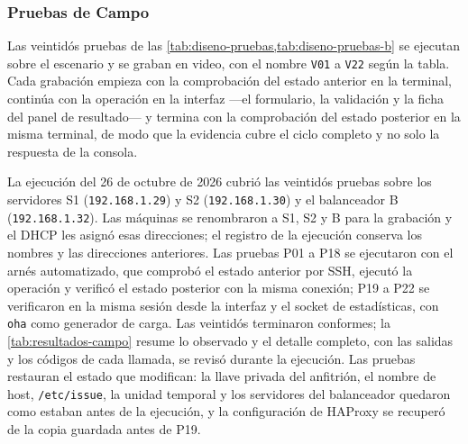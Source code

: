 \subsubsection{Pruebas de Campo}
\label{sec:resultados-campo}

Las veintidós pruebas de las \cref{tab:diseno-pruebas,tab:diseno-pruebas-b} se ejecutan sobre
el escenario y se graban en video, con el nombre \texttt{V01} a
\texttt{V22} según la tabla. Cada grabación empieza con la comprobación
del estado anterior en la terminal, continúa con la operación en la
interfaz ---el formulario, la validación y la ficha del panel de
resultado--- y termina con la comprobación del estado posterior en la
misma terminal, de modo que la evidencia cubre el ciclo completo y no
solo la respuesta de la consola.

La ejecución del 26 de octubre de 2026 cubrió las veintidós pruebas
sobre los servidores S1 (\texttt{192.168.1.29}) y S2
(\texttt{192.168.1.30}) y el balanceador B (\texttt{192.168.1.32}). Las
máquinas se renombraron a S1, S2 y B para la grabación y el DHCP les
asignó esas direcciones; el registro de la ejecución conserva los nombres
y las direcciones anteriores. Las pruebas P01 a P18 se ejecutaron con el
arnés automatizado, que comprobó
el estado anterior por SSH, ejecutó la operación y verificó el estado
posterior con la misma conexión; P19 a P22 se verificaron en la misma
sesión desde la interfaz y el socket de estadísticas, con \texttt{oha}
como generador de carga. Las veintidós terminaron conformes; la
\cref{tab:resultados-campo} resume lo observado
y el detalle completo, con las salidas y los códigos de cada llamada,
se revisó durante la ejecución. Las pruebas restauran el
estado que modifican: la llave privada del anfitrión, el nombre de host,
\texttt{/etc/issue}, la unidad temporal y los servidores del
balanceador quedaron como estaban antes de la ejecución, y la
configuración de HAProxy se recuperó de la copia guardada antes de P19.

